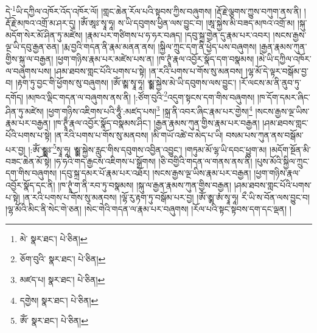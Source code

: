 དེ་\footnote{མེ་  སྣར་ཐང་།  པེ་ཅིན། }ཡི་དཀྱིལ་འཁོར་འོད་འཁོར་ལོ། །གླང་ཆེན་རོལ་པའི་སྟབས་ཀྱིས་བཞུགས། །རྡོ་རྗེ་ལྕགས་ཀྱུས་བཀུག་ནས་ནི། །རྡོ་རྗེ་མཁའ་འགྲོ་མ་ཤར་དུ། །ཨོཾ་ཨཱཿ་སྭཱ་ཧཱ། ས་ཡི་དབུགས་ཕྱིན་ལས་བྱུང་བ། །ཨཱ་སྐྱེས་མི་བཟད་མཁའ་འགྲོ་མ། །སྐུ་མདོག་སེར་མོ་ཤིན་ཏུ་མཛེས། །རྣམ་པར་གཙིགས་པ་ཧ་ཧར་བཞད། །དབུ་སྐྲ་གྱེན་དུ་རྣམ་པར་འབར། །སངས་རྒྱས་ལྔ་ཡི་དབུ་རྒྱན་ཅན། །རྨ་བྱའི་གདན་ནི་རྣམ་མནན་ནས། །སྐྱིལ་ཀྲུང་དག་ནི་ཕྱེད་པས་བཞུགས། །རྒྱན་རྣམས་ཀུན་གྱིས་སྐུ་ལ་བརྒྱན། །ཕྱག་གཉིས་རྣམ་པར་མཛེས་པས་ན། །ཁ་ཊྭཱཾ་རྣལ་འབྱོར་སྣོད་དག་བསྣམས། །མེ་ཡི་དཀྱིལ་འཁོར་ལ་བཞུགས་པས། །ཤམ་ཐབས་གླང་པོའི་པགས་པ་སྟེ། །ན་རའི་པགས་པ་གོས་སུ་མནབས། །ལྷ་མོ་དེ་ལྟར་བསྒོམ་བྱ་བ། །རྟག་ཏུ་བྱང་གི་ཕྱོགས་སུ་བཞུགས། །ཨོཾ་ཨྸ་སྭཱ་ཧཱ། ཨྸྸ་སྐྱེས་མེ་ཡི་དབུགས་ལས་བྱུང་། །རོ་ལངས་མ་ནི་ནུབ་ཏུ་དགོད། །མཁའ་ལྡིང་གདན་ལ་བཞུགས་ནས་ནི། །:ཙོག་བུའི་\footnote{ཅོག་བུའི་  སྣར་ཐང་།  པེ་ཅིན། }འདུག་སྟངས་དག་གིས་བཞུགས། །ཁ་དོག་དམར་ཞིང་ཤིན་ཏུ་མཛེས། །ཕྱག་གཉིས་འཇིགས་པའི་ཧཱུྃ་:མཛད་པས།\footnote{མཛད་པ།  སྣར་ཐང་།  པེ་ཅིན། } །སྐྲ་ནི་འབར་ཞིང་རྣམ་པར་གྱེས།\footnote{དགྱེས།  སྣར་ཐང་།  པེ་ཅིན། } །སངས་རྒྱས་ལྔ་ཡིས་རྣམ་པར་བརྒྱན། །ཁ་ཊྭཱྃ་རྣལ་འབྱོར་སྣོད་བསྣམས་ཤིང་། །རྒྱན་རྣམས་ཀུན་གྱིས་རྣམ་པར་བརྒྱན། །ཤམ་ཐབས་གླང་པོའི་པགས་པ་སྟེ། །ན་རའི་པགས་པ་གོས་སུ་མནབས། །མི་གཡོ་འཚེ་བ་མེད་པ་ཡི། བསམ་པས་ཀུན་ནས་བསྒོམ་པར་བྱ། །:ཨོཾ་ཨྸྸཿ་\footnote{ཨོཾ་  སྣར་ཐང་།  པེ་ཅིན། }སྭཱ་ཧཱ། ཨྸྸ་སྐྱེས་རླུང་གིས་དབུགས་འབྱིན་འབྱུང་། །གཏུམ་མོ་ལྷ་ཡི་དབང་ཕྱུག་མ། །མདོག་སྔོན་མི་བཟང་ཆེན་མོ་སྟེ། །ཧ་ཧའི་གད་རྒྱངས་འཇིགས་པ་སྒྲོགས། །ཅི་བགྱིའི་གདན་ལ་གནས་ནས་ནི། །པུས་མོའི་སྐྱིལ་ཀྲུང་དག་གིས་བཞུགས། །དབུ་སྐྲ་དམར་པོ་རྣམ་པར་འཐོར། །སངས་རྒྱས་ལྔ་ཡིས་རྣམ་པར་བརྒྱན། །ཕྱག་གཉིས་རྣལ་འབྱོར་སྣོད་དང་ནི། །ཁ་ཊྭཱཾ་ག་ནི་རབ་ཏུ་བསྣམས། །སྐུ་ལ་རྒྱན་རྣམས་ཀུན་གྱིས་བརྒྱན། །ཤམ་ཐབས་གླང་པོའི་པགས་པ་སྟེ། །ན་རའི་པགས་པ་གོས་སུ་མནབས། །ལྷོ་རུ་རྟག་ཏུ་བསྒོམ་པར་བྱ། །ཨོཾ་ཨྸ་ཨཾ་སྭཱ་ཧཱ། རྀ་ཡི་ས་བོན་ལས་བྱུང་བ། །ལྷ་མོའི་མིང་ནི་སེང་གེ་ཅན། །སེང་གེའི་གདན་ལ་རྣམ་པར་བཞུགས། །རོལ་པའི་སྟང་སྟབས་དག་དང་ལྡན། །
